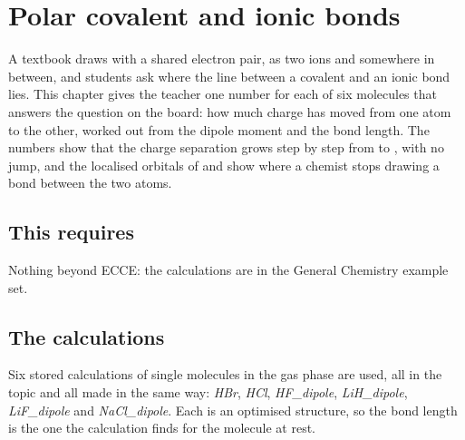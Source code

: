 \chapter{Polar covalent and ionic bonds}
\label{ch:t-polar-ionic}

A textbook draws  with a shared electron pair,  as two ions and  somewhere in between, and students ask where the line between a covalent and an ionic bond lies. This chapter gives the teacher one number for each of six molecules that answers the question on the board: how much charge has moved from one atom to the other, worked out from the dipole moment and the bond length. The numbers show that the charge separation grows step by step from  to , with no jump, and the localised orbitals of  and  show where a chemist stops drawing a bond between the two atoms.

\section*{This requires}
Nothing beyond ECCE: the calculations are in the General Chemistry example set.

\section{The calculations}
Six stored calculations of single molecules in the gas phase are used, all in the topic  and all made in the same way: \emph{HBr}, \emph{HCl}, \emph{HF\_dipole}, \emph{LiH\_dipole}, \emph{LiF\_dipole} and \emph{NaCl\_dipole}. Each is an optimised structure, so the bond length is the one the calculation finds for the molecule at rest.

